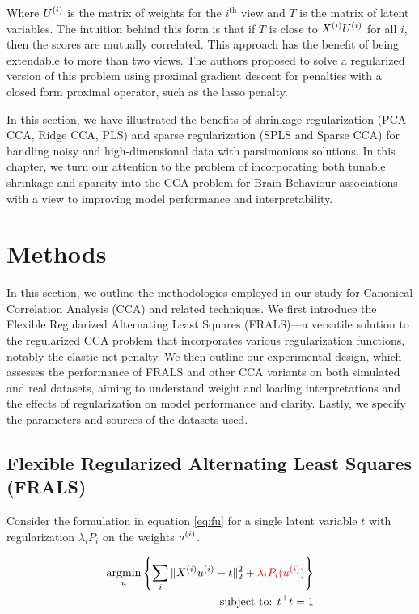 Where \(U^{(i)}\) is the matrix of weights for the $i^{\text{th}}$ view and \(T\) is the matrix of latent variables.
The intuition behind this form is that if \(T\) is close to \(X^{(i)} U^{(i)}\) for all \(i\), then the scores are mutually correlated.
This approach has the benefit of being extendable to more than two views.
The authors proposed to solve a regularized version of this problem using proximal gradient descent for penalties with a closed form proximal operator, such as the lasso penalty.

In this section, we have illustrated the benefits of shrinkage regularization (PCA-CCA, Ridge CCA, PLS) and sparse regularization (SPLS and Sparse CCA) for handling noisy and high-dimensional data with parsimonious solutions.
In this chapter, we turn our attention to the problem of incorporating both tunable shrinkage and sparsity into the CCA problem for Brain-Behaviour associations with a view to improving model performance and interpretability.

\section{Methods}

In this section, we outline the methodologies employed in our study for Canonical Correlation Analysis (CCA) and related techniques.
We first introduce the Flexible Regularized Alternating Least Squares (FRALS)—a versatile solution to the regularized CCA problem that incorporates various regularization functions, notably the elastic net penalty\cite{zou2005regularization}.
We then outline our experimental design, which assesses the performance of FRALS and other CCA variants on both simulated and real datasets, aiming to understand weight and loading interpretations and the effects of regularization on model performance and clarity.
Lastly, we specify the parameters and sources of the datasets used.

\subsection{Flexible Regularized Alternating Least Squares (FRALS)}\label{subsec:flexible-regularized-alternating-least
-squares-(frals)}

Consider the formulation in equation \ref{eq:fu} for a single latent variable \(t\) with regularization $\lambda_i P_i$ on the weights \(u^{(i)}\).

\begin{align}
    \underset{u}{\mathrm{argmin}}\left\{\sum_i \|X^{(i)} u^{(i)} - t\|_2^2 + \textcolor{red}{\lambda_i P_i(u^{(i)})} \right\}\\
    \text{subject to: }t^\top t = 1\\
\end{align}

